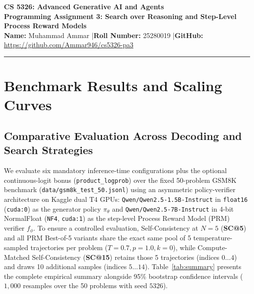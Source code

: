 \documentclass[10pt,a4paper]{article}
\begin{document}
\begin{center}
    {\Large\bfseries CS 5326: Advanced Generative AI and Agents}\\[3pt]
    {\large\bfseries Programming Assignment 3: Search over Reasoning and Step-Level Process Reward Models}\\[5pt]
    {\small \textbf{Name:} Muhammad Ammar \quad|\quad \textbf{Roll Number:} 25280019 \quad|\quad \textbf{GitHub:} \url{https://github.com/Ammar946/cs5326-pa3}}
\end{center}
\vspace{-4pt}
\noindent\rule{\textwidth}{0.6pt}
\vspace{-6pt}

\section{Benchmark Results and Scaling Curves}

\subsection{Comparative Evaluation Across Decoding and Search Strategies}
\sloppy
We evaluate six mandatory inference-time configurations plus the optional continuous-logit bonus (\texttt{product\_logprob}) over the fixed 50-problem GSM8K benchmark (\texttt{data/gsm8k\_test\_50.jsonl}) using an asymmetric policy-verifier architecture on Kaggle dual T4 GPUs: \texttt{Qwen/Qwen2.5-1.5B-Instruct} in \texttt{float16} (\texttt{cuda:0}) as the generator policy $\pi_\theta$ and \texttt{Qwen/Qwen2.5-7B-Instruct} in 4-bit NormalFloat (\texttt{NF4}, \texttt{cuda:1}) as the step-level Process Reward Model (PRM) verifier $f_\phi$. To ensure a controlled evaluation, Self-Consistency at $N=5$ (\textbf{SC@5}) and all PRM Best-of-5 variants share the exact same pool of 5 temperature-sampled trajectories per problem ($T=0.7, p=1.0, k=0$), while Compute-Matched Self-Consistency (\textbf{SC@15}) retains those 5 trajectories (indices $0\dots 4$) and draws 10 additional samples (indices $5\dots 14$). Table~\ref{tab:summary} presents the complete empirical summary alongside 95\% bootstrap confidence intervals ($1{,}000$ resamples over the 50 problems with seed $5326$).
\end{document}
